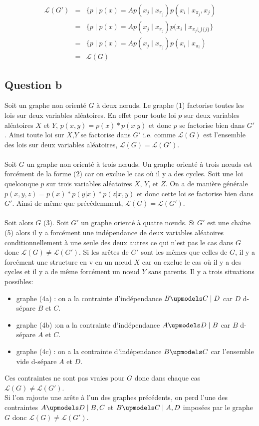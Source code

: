 \documentclass{article}
\begin{document}
\begin{align}
\mathcal{L}(G') & = & \{ p \mid p(x) = A p(x_j \mid x_{\pi_j}) p(x_i \mid x_{\pi_j}, x_j) \\
	        & = & \{ p \mid p(x) = A p(x_j \mid x_{\pi_j}) p(x_i \mid x_{\pi_j \bigcup \{j\}} \} \\
		& = & \{ p \mid p(x) = A p(x_j \mid x_{\pi_j}) p(x_i \mid x_{\pi_i}) \\
		& = & \mathcal{L}(G)
\end{align}


\subsection{Question b}
Soit un graphe non orienté $G$ à deux nœuds. Le graphe (1) factorise toutes les lois sur deux variables aléatoires. En effet pour toute loi $p$ sur deux variables aléatoires $X$ et $Y$, $p(x,y)=p(x)*p(x|y)$ et donc $p$ se factorise bien dans $G'$. Ainsi toute loi sur $X$,$Y$ se factorise dans $G'$ i.e. comme $\mathcal{L}(G)$ est l'ensemble des lois sur deux variables aléatoires, $\mathcal{L}(G)=\mathcal{L}(G')$.  \\\\
Soit $G$ un graphe non orienté à trois nœuds. Un graphe orienté à trois nœuds est forcément de la forme (2) car on exclue le cas où il y a des cycles. Soit une loi quelconque $p$ sur trois variables aléatoires $X$, $Y$, et $Z$. On a de manière générale $p(x,y,z) = p(x)*p(y|x)*p(z|x,y)$ et donc cette loi se factorise bien dans $G'$. Ainsi de même que précédemment, $\mathcal{L}(G)=\mathcal{L}(G')$. \\\\
Soit alors $G$ (3). Soit $G'$ un graphe orienté à quatre nœuds. Si $G'$ est une chaîne (5) alors il y a forcément une indépendance de deux variables aléatoires conditionnellement à une seule des deux autres ce qui n'est pas le cas dans $G$ donc $\mathcal{L}(G) \neq \mathcal{L}(G')$. Si les arêtes de $G'$ sont les mêmes que celles de $G$, il y a forcément une structure en v en un nœud $X$ car on exclue le cas où il y a des cycles et il y a de même forcément un nœud $Y$ sans parents. Il y a trois situations possibles: 
\begin{itemize}
\item graphe (4a) : on a la contrainte d'indépendance $B \upmodels C \mid D$ car $D$ d-sépare $B $ et $C$.
\item graphe (4b) :on a la contrainte d'indépendance $A \upmodels D \mid B$ car $B$ d-sépare $A$ et $C$.
\item graphe (4c) : on a la contrainte d'indépendance $B \upmodels C$ car l'ensemble vide d-sépare $A$ et $D$.
\end{itemize} 
Ces contraintes ne sont pas vraies pour $G$ donc dans chaque cas $\mathcal{L}(G) \neq \mathcal{L}(G')$.\\
Si l'on rajoute une arête à l'un des graphes précédents, on perd l'une des contraintes $A \upmodels D \mid B,C$ et $B \upmodels C \mid A,D$ imposées par le graphe $G$ donc $\mathcal{L}(G) \neq \mathcal{L}(G')$. \\
\end{document}
